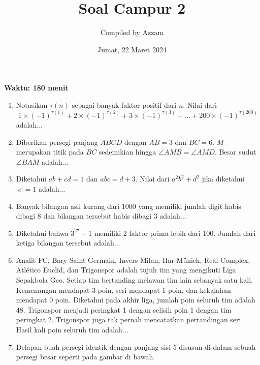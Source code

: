 \documentclass[11pt]{scrartcl}
\title{Soal Campur 2}
\author{Compiled by Azzam}
\date{Jumat, 22 Maret 2024}
\begin{document}
\maketitle
\textbf{Waktu: 180 menit}

\begin{enumerate}
    \item Notasikan $\tau(n)$ sebagai banyak faktor positif dari $n$. Nilai dari
        $$1 \times (-1)^{\tau(1)} + 2 \times (-1)^{\tau(2)} + 3 \times (-1)^{\tau(3)} + \ldots + 200 \times (-1)^{\tau(200)}$$
        adalah...
    \item Diberikan persegi panjang $ABCD$ dengan $AB = 3$ dan $BC = 6$. $M$ merupakan titik pada $BC$ sedemikian hingga $\angle AMB = \angle AMD$. Besar sudut $\angle BAM$ adalah...
    \item Diketahui $ab + cd = 1$ dan $abc = d + 3$. Nilai dari $a^2b^2 + d^2$ jika diketahui $|c| = 1$ adalah...
    \item Banyak bilangan asli kurang dari 1000 yang memiliki jumlah digit habis dibagi 8 dan bilangan tersebut habis dibagi 3 adalah...
    \item Diketahui bahwa $3^{27} + 1$ memiliki 2 faktor prima lebih dari 100. Jumlah dari ketiga bilangan tersebut adalah...
    \item Analit FC, Bary Saint-Germain, Invers Milan, Har-Münich, Real Complex, Atlético Euclid, dan Trigonspor adalah tujuh tim yang mengikuti Liga Sepakbola Geo. Setiap tim bertanding melawan tim lain sebanyak satu kali. Kemenangan mendapat 3 poin, seri mendapat 1 poin, dan kekalahan mendapat 0 poin. Diketahui pada akhir liga, jumlah poin seluruh tim adalah 48. Trigonspor menjadi peringkat 1 dengan selisih poin 1 dengan tim peringkat 2. Trigonspor juga tak pernah mencatatkan pertandingan seri. Hasil kali poin seluruh tim adalah...
    \item Delapan buah persegi identik dengan panjang sisi 5 disusun di dalam sebuah persegi besar seperti pada gambar di bawah.\\
            \begin{figure}[h]
                \centering

\end{figure}
\end{enumerate}
\end{document}
